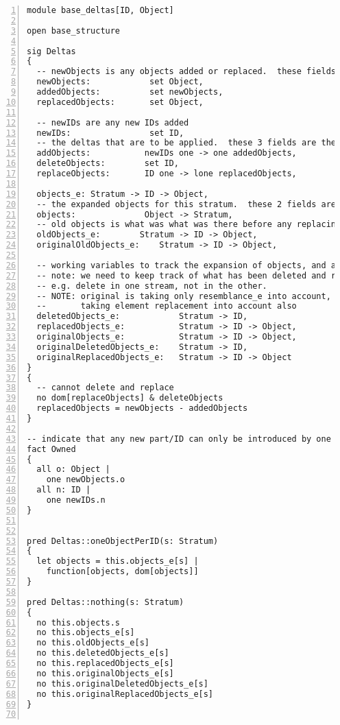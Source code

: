 \lstset{frame=tb, aboveskip=12pt, belowskip=-3pt, breaklines=true, tabsize=2, mathescape=true}
\begin{lstlisting}[caption={base\_deltas.als}, numbers=left]
module base_deltas[ID, Object]

open base_structure

sig Deltas
{
  -- newObjects is any objects added or replaced.  these fields allow new object creation to be controlled
  newObjects:            set Object,
  addedObjects:          set newObjects,
  replacedObjects:       set Object,
  
  -- newIDs are any new IDs added
  newIDs:                set ID,
  -- the deltas that are to be applied.  these 3 fields are the input to the merge
  addObjects:           newIDs one -> one addedObjects,
  deleteObjects:        set ID,
  replaceObjects:       ID one -> lone replacedObjects,

  objects_e: Stratum -> ID -> Object,
  -- the expanded objects for this stratum.  these 2 fields are the output of the merge!
  objects:              Object -> Stratum,
  -- old objects is what was what was there before any replacing was done
  oldObjects_e:        Stratum -> ID -> Object,
  originalOldObjects_e:    Stratum -> ID -> Object,

  -- working variables to track the expansion of objects, and allow it to happen cumulatively
  -- note: we need to keep track of what has been deleted and replaced to handle the cumulative effects
  -- e.g. delete in one stream, not in the other.
  -- NOTE: original is taking only resemblance_e into account, non-original is the full definition
  --       taking element replacement into account also
  deletedObjects_e:            Stratum -> ID,
  replacedObjects_e:           Stratum -> ID -> Object,  
  originalObjects_e:           Stratum -> ID -> Object,
  originalDeletedObjects_e:    Stratum -> ID,
  originalReplacedObjects_e:   Stratum -> ID -> Object
}
{
  -- cannot delete and replace
  no dom[replaceObjects] & deleteObjects
  replacedObjects = newObjects - addedObjects
}

-- indicate that any new part/ID can only be introduced by one component
fact Owned
{
  all o: Object |
    one newObjects.o
  all n: ID |
    one newIDs.n
}


pred Deltas::oneObjectPerID(s: Stratum)
{
  let objects = this.objects_e[s] |
    function[objects, dom[objects]]
}

pred Deltas::nothing(s: Stratum)
{
  no this.objects.s
  no this.objects_e[s]
  no this.oldObjects_e[s]
  no this.deletedObjects_e[s]
  no this.replacedObjects_e[s]
  no this.originalObjects_e[s]
  no this.originalDeletedObjects_e[s]
  no this.originalReplacedObjects_e[s]
}


\end{lstlisting}
